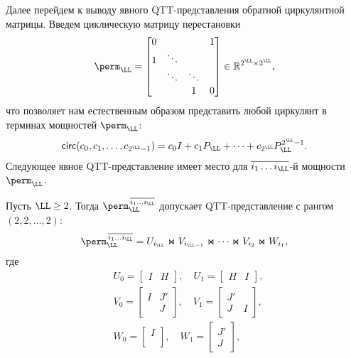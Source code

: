 Далее перейдем к выводу явного QTT-представления обратной циркулянтной матрицы.
Введем циклическую матрицу перестановки
\[
\perm_\LL = 
\begin{bmatrix}
0 & & & 1 \\
1 & \ddots \\
& \ddots & \ddots \\
& & 1 & 0
\end{bmatrix}\in\mathbb{R}^{2^\LL \times 2^\LL},
\]
что позволяет нам естественным образом представить любой циркулянт в терминах мощностей $\perm_\LL$:
\[
\mathsf{circ}(c_0,c_1,\dots, c_{2^{\LL}-1}) = c_0 I + c_1 P_\LL + \dots + c_{2^\LL} P_\LL^{2^\LL -1}.
\]
Следующее явное QTT-представление имеет место для $\overline{i_1\dots i_\LL}$-й мощности $\perm_\LL$.

\begin{lemma} \label{lm:perm}
	Пусть $\LL \geq 2$. Тогда $\perm_\LL^{\,\overline{i_1\dots i_\LL}}$ допускает QTT-представление с рангом $(2,2,\dots,2)$:
	\[
	\perm_\LL^{\,\overline{i_1\dots i_\LL}} = U_{i_\LL} \Join V_{i_{\LL-1}} \Join \dots \Join V_{i_{2}} \Join W_{i_1},
	\]
	где
	\[
	\begin{split}
	&U_0 = 
	\begin{bmatrix}
	I & H
	\end{bmatrix},
	\quad
	U_1 = 
	\begin{bmatrix}
	H & I
	\end{bmatrix},
	\\
	&V_0 = 
	\begin{bmatrix}
	I & J' \\
	& J
	\end{bmatrix},
	\quad
	V_1 = 
	\begin{bmatrix}
	J' &  \\
	J  & I 
	\end{bmatrix},
	\\
	&W_0 = 
	\begin{bmatrix}
	I  \\ \\
	\end{bmatrix},
	\quad
	W_1 = 
	\begin{bmatrix}
	J' \\ J
	\end{bmatrix},
	\end{split}
	\]
\end{lemma}

